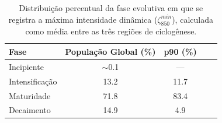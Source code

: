 \begin{table}[htbp]
\centering
\caption[Fase evolutiva de máxima intensidade dinâmica]{Distribuição percentual da fase evolutiva em que se registra a máxima intensidade dinâmica ($\zeta_{850}^{min}$), calculada como média entre as três regiões de ciclogênese.}
\label{tab:fase_max_intensidad}
\begin{tabular*}{\textwidth}{@{\extracolsep{\fill}}lcccc}
\hline
\textbf{Fase} & \textbf{População Global (\%)} & \textbf{p90 (\%)} \\
\hline
Incipiente       & $\sim$0.1 & ---  \\
Intensificação  & 13.2      & 11.7 \\
Maturidade       & 71.8      & 83.4 \\
Decaimento      & 14.9      & 4.9  \\
\hline
\end{tabular*}
\end{table}
